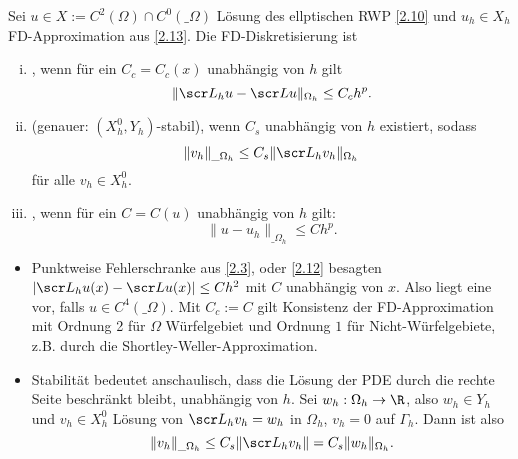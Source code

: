 \begin{df} \label{2.21}
	Sei $u \in X := C^2(\Omega) \cap C^0(\_\Omega)$ Lösung des ellptischen RWP \ref{2.10} und $u_h \in X_h$ FD-Approximation aus \ref{2.13}.
	Die FD-Diskretisierung ist
	\begin{enumerate}[i)]
		\item
			, wenn für ein $C_c = C_c(x)$ unabhängig von $h$ gilt
			\[
				\|\scr L_h u - \scr L u\|_{\Omega_h} \le C_c h^p.
			\]
		\item
			 (genauer: $(X_h^0, Y_h)$-stabil), wenn $C_s$ unabhängig von $h$ existiert, sodass
			\[
				\|v_h\|_{\_\Omega_h} \le C_s \|\scr L_h v_h\|_{\Omega_h}
			\]
			für alle $v_h \in X_h^0$.
		\item
			, wenn für ein $C = C(u)$ unabhängig von $h$ gilt:
			\[
				\|u - u_h\|_{\_\Omega_h} \le C h^p.
			\]
	\end{enumerate}
	\begin{note}
		\begin{itemize}
			\item
				Punktweise Fehlerschranke aus \ref{2.3}, oder \ref{2.12} besagten $|\scr L_h u(x) - \scr L u(x)| \le C h^2$ mit $C$ unabhängig von $x$.
				Also liegt eine  vor, falls $u \in C^4(\_\Omega)$.
				Mit $C_c := C$ gilt Konsistenz der FD-Approximation mit Ordnung 2 für $\Omega$ Würfelgebiet und Ordnung $1$ für Nicht-Würfelgebiete, z.B. durch die Shortley-Weller-Approximation.
		\end{itemize}
	\end{note}
	\begin{note}[Stabilität]
		\begin{itemize}
			\item
				Stabilität bedeutet anschaulisch, dass die Lösung der PDE durch die rechte Seite beschränkt bleibt, unabhängig von $h$.
				Sei $w_h: \Omega_h \to \R$, also $w_h \in Y_h$ und $v_h \in X_h^0$ Lösung von $\scr L_h v_h = w_h$ in $\Omega_h$, $v_h = 0$ auf $\Gamma_h$.
				Dann ist also
				\[
					\|v_h\|_{\_\Omega_h} \le C_s \|\scr L_h v_h\| = C_s \|w_h\|_{\Omega_h}.
				\]
		\end{itemize}
	\end{note}
\end{df}

